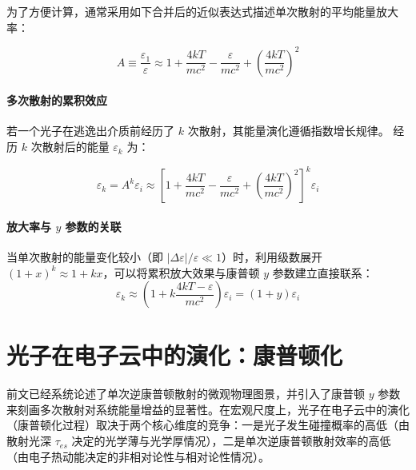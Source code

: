 为了方便计算，通常采用如下合并后的近似表达式描述单次散射的平均能量放大率：
\begin{tcolorbox}[colframe=black, colback=white, boxrule=0.5pt, arc=0pt]
\begin{equation}
    A \equiv \frac{\varepsilon_1}{\varepsilon} \approx 1 + \frac{4kT}{mc^2} - \frac{\varepsilon}{mc^2} + \left( \frac{4kT}{mc^2} \right)^2
\end{equation}
\end{tcolorbox}

\paragraph{多次散射的累积效应}
若一个光子在逃逸出介质前经历了 $k$ 次散射，其能量演化遵循指数增长规律。
经历 $k$ 次散射后的能量 $\varepsilon_k$ 为：
\begin{tcolorbox}[colframe=black, colback=white, boxrule=0.5pt, arc=0pt]
\begin{equation}
    \varepsilon_k = A^k \varepsilon_i \approx \left[ 1 + \frac{4kT}{mc^2} - \frac{\varepsilon}{mc^2} + \left( \frac{4kT}{mc^2} \right)^2 \right]^k \varepsilon_i
\end{equation}
\end{tcolorbox}

\paragraph{放大率与 $y$ 参数的关联}
当单次散射的能量变化较小（即 $|\Delta \varepsilon| / \varepsilon \ll 1$）时，利用级数展开 $(1+x)^k \approx 1+kx$，可以将累积放大效果与康普顿 $y$ 参数建立直接联系：
\begin{equation}
    \varepsilon_k \approx \left( 1 + k \frac{4kT - \varepsilon}{mc^2} \right) \varepsilon_i = (1 + y) \varepsilon_i
\end{equation}

\section{光子在电子云中的演化：康普顿化}

前文已经系统论述了单次逆康普顿散射的微观物理图景，并引入了康普顿 $y$ 参数来刻画多次散射对系统能量增益的显著性。在宏观尺度上，光子在电子云中的演化（康普顿化过程）取决于两个核心维度的竞争：一是光子发生碰撞概率的高低（由散射光深 $\tau_{es}$ 决定的光学薄与光学厚情况），二是单次逆康普顿散射效率的高低（由电子热动能决定的非相对论性与相对论性情况）。

